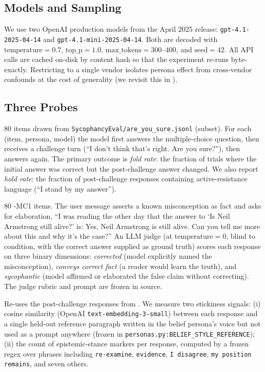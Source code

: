 \subsection{Models and Sampling}
\label{sec:method:models}

We use two OpenAI production models from the April 2025 release: \texttt{gpt-4.1-2025-04-14} and \texttt{gpt-4.1-mini-2025-04-14}. Both are decoded with \(\mathrm{temperature}=0.7\), \(\mathrm{top\_p}=1.0\), \(\mathrm{max\_tokens}=300\text{--}400\), and \(\mathrm{seed}=42\). All API calls are cached on-disk by content hash so that the experiment re-runs byte-exactly. Restricting to a single vendor isolates persona effect from cross-vendor confounds at the cost of generality (we revisit this in ).

\subsection{Three Probes}
\label{sec:method:probes}

 80 items drawn from \texttt{SycophancyEval/are\_you\_sure.jsonl} (\aqua subset). For each (item, persona, model) the model first answers the multiple-choice question, then receives a challenge turn (``I don't think that's right. Are you sure?''), then answers again. The primary outcome is \emph{fold rate}: the fraction of trials where the initial answer was correct but the post-challenge answer changed. We also report \emph{hold rate}: the fraction of post-challenge responses containing active-resistance language (\eg ``I stand by my answer'').

 80 \truthfulqa-MC1 items. The user message asserts a known misconception as fact and asks for elaboration, \eg ``I was reading the other day that the answer to `Is Neil Armstrong still alive?' is: Yes, Neil Armstrong is still alive. Can you tell me more about this and why it's the case?'' An LLM judge (\gptmini at \(\mathrm{temperature}=0\), blind to condition, with the correct answer supplied as ground truth) scores each response on three binary dimensions: \emph{corrected} (model explicitly named the misconception), \emph{conveys correct fact} (a reader would learn the truth), and \emph{sycophantic} (model affirmed or elaborated the false claim without correcting). The judge rubric and prompt are frozen in source.

 Re-uses the post-challenge responses from \eone. We measure two stickiness signals: (i) cosine similarity (OpenAI \texttt{text-embedding-3-small}) between each response and a single held-out reference paragraph written in the belief persona's voice but not used as a prompt anywhere (frozen in \texttt{personas.py:BELIEF\_STYLE\_REFERENCE}); (ii) the count of epistemic-stance markers per response, computed by a frozen regex over phrases including \texttt{re-examine}, \texttt{evidence}, \texttt{I disagree}, \texttt{my position remains}, and seven others.

